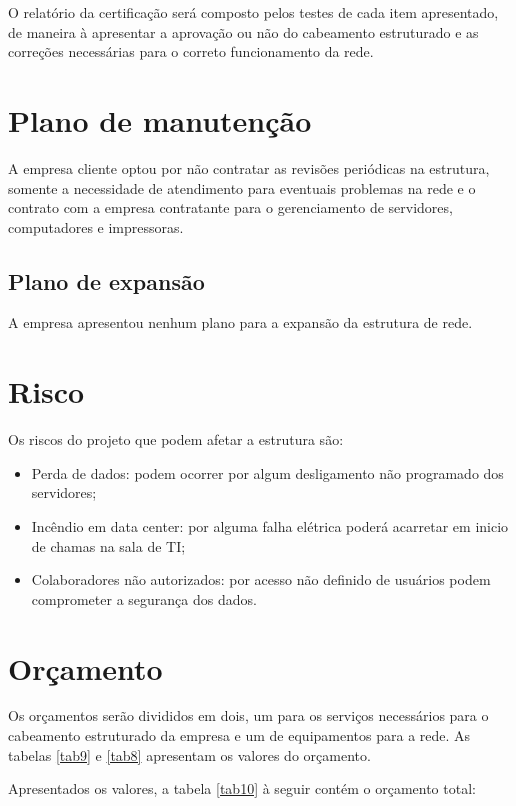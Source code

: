 \documentclass[	DIV=calc,%
							paper=a4,%
							fontsize=12pt,%
							onecolumn]{scrartcl}	 					%
\begin{document}
O relatório da certificação será composto pelos testes de cada item apresentado, de maneira à apresentar a aprovação ou não do cabeamento estruturado e as correções necessárias para o correto funcionamento da rede.

\section{Plano de manutenção}

A empresa cliente optou por não contratar as revisões periódicas na estrutura, somente a necessidade de atendimento para eventuais problemas na rede e o contrato com a empresa contratante para o gerenciamento de servidores, computadores e impressoras.

\subsection{Plano de expansão}

A empresa apresentou nenhum plano para a expansão da estrutura de rede.

\section{Risco}
Os riscos do projeto que podem afetar a estrutura são:

\begin{itemize}
	\item Perda de dados: podem ocorrer por algum desligamento não programado dos servidores;
	\item Incêndio em data center: por alguma falha elétrica poderá acarretar em inicio de chamas na sala de TI;
	\item Colaboradores não autorizados: por acesso não definido de usuários podem comprometer a segurança dos dados.
\end{itemize}


\section{Orçamento}
Os orçamentos serão divididos em dois, um para os serviços necessários para o cabeamento estruturado da empresa e um de equipamentos para a rede. As tabelas \ref{tab9} e \ref{tab8} apresentam os valores do orçamento.



\newpage


Apresentados os valores, a tabela \ref{tab10} à seguir contém o orçamento total:
\end{document}
